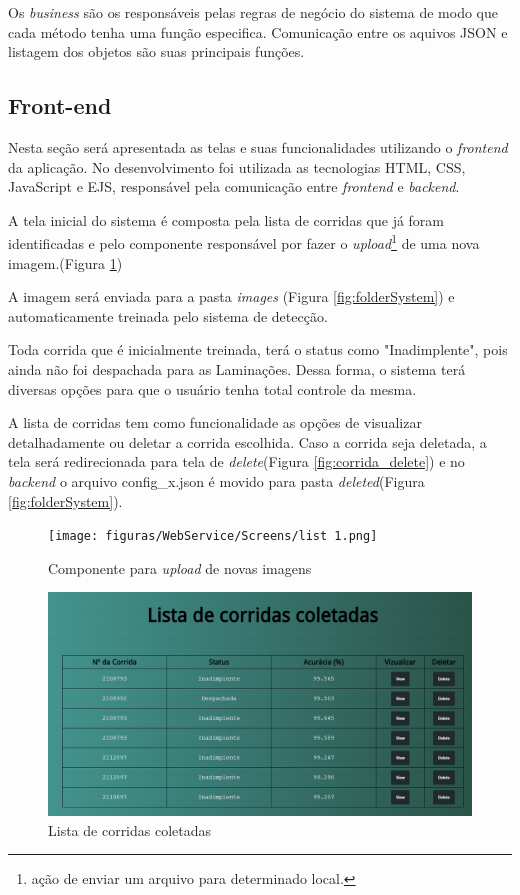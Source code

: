 Os \textit{business} são os responsáveis pelas regras de negócio do sistema de modo que cada método tenha uma função especifica. Comunicação entre os aquivos JSON e listagem dos objetos são suas principais funções.

\subsection{Front-end}

Nesta seção será apresentada as telas e suas funcionalidades utilizando o \textit{frontend} da aplicação. No desenvolvimento foi utilizada as tecnologias HTML, CSS, JavaScript e EJS, responsável pela comunicação entre \textit{frontend} e \textit{backend}.

A tela inicial do sistema é composta pela lista de corridas que já foram identificadas e pelo componente responsável por fazer o \textit{upload}\footnote{ação de enviar um arquivo para determinado local.} de uma nova imagem.(Figura \ref{fig:list1})

A imagem será enviada para a pasta \textit{images} (Figura \ref{fig:folderSystem}) e automaticamente treinada pelo sistema de detecção.

Toda corrida que é inicialmente treinada, terá o status como "Inadimplente", pois ainda não foi despachada para as Laminações. Dessa forma, o sistema terá diversas opções para que o usuário tenha total controle da mesma.

A lista de corridas tem como funcionalidade as opções de visualizar detalhadamente ou deletar a corrida escolhida. Caso a corrida seja deletada, a tela será redirecionada para tela de \textit{delete}(Figura \ref{fig:corrida_delete}) e no \textit{backend} o arquivo config\_x.json é movido para pasta \textit{deleted}(Figura \ref{fig:folderSystem}).

\begin{figure}[H]
	\centering
	\texttt{[image: figuras/WebService/Screens/list  1.png]}
	\caption{Componente para \textit{upload} de novas imagens}
	\label{fig:list1}
\end{figure}

\begin{figure}[H]
	\centering
	\includegraphics[width=1\linewidth]{figuras/WebService/Screens/list 2.png}
	\caption{Lista de corridas coletadas}
	\label{fig:list2}
\end{figure}

